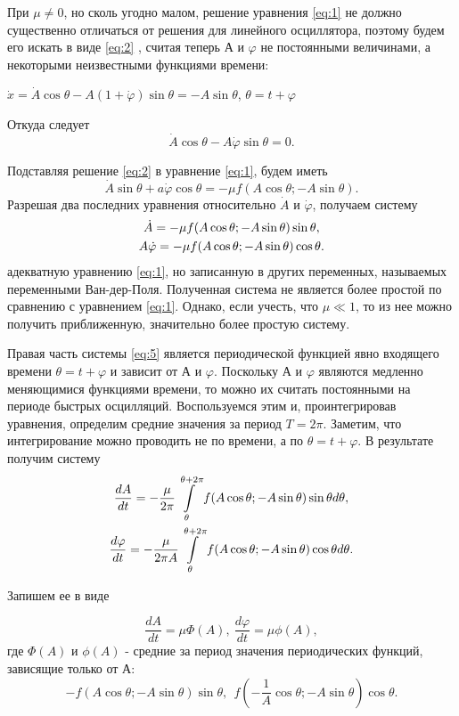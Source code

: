 При $\mu \ne 0$, но сколь угодно малом, решение уравнения \eqref{eq:1}  не должно существенно отличаться от решения для линейного осциллятора, поэтому будем его искать в виде \eqref{eq:2} , считая теперь А и $\varphi$ не постоянными величинами, а некоторыми неизвестными функциями времени:

\begin{center}
$\dot{x}=\dot{A} \cos\theta-A(1+\dot \varphi)\sin\theta=-A\sin\theta$, $\theta=t+\varphi$
\end{center}

Откуда следует $$\dot{A}\cos\theta-A\dot \varphi \sin\theta=0.$$

Подставляя решение  \eqref{eq:2} в уравнение  \eqref{eq:1}, будем иметь $$\dot{A}\sin\theta+a\dot \varphi \cos\theta=-\mu f(A\cos\theta;-A\sin\theta).$$
Разрешая два последних уравнения относительно $\dot{A}$ и $\dot{\varphi}$, получаем систему
\begin{gather}
\label{eq:5}
\dot{A}=-\mu f(A\cos\theta;-A\sin\theta)\sin\theta,\\\notag
A\dot{\varphi}=-\mu f(A\cos\theta;-A\sin\theta) \cos\theta.
\end{gather}
адекватную уравнению \eqref{eq:1}, но записанную в других переменных, называемых переменными Ван-дер-Поля. Полученная система не является более простой по сравнению с уравнением \eqref{eq:1}. Однако, если учесть, что $\mu \ll 1$, то из нее можно получить приближенную, значительно более простую систему.

Правая часть системы  \eqref{eq:5} является периодической функцией явно входящего времени $\theta=t+\varphi$ и зависит от А и $\varphi$. Поскольку  А и $\varphi$ являются медленно меняющимися функциями времени, то можно их считать постоянными на периоде быстрых осцилляций. Воспользуемся этим и, проинтегрировав уравнения, определим средние значения за период $T=2\pi$. Заметим, что интегрирование можно проводить не по времени, а по $\theta=t+\varphi$. В результате получим систему
\begin{gather}
\label{eq:6}
\frac{dA}{dt}=-\frac{\mu}{2\pi}\int\limits_\theta^{\theta+2\pi} f(A\cos\theta;-A\sin\theta)\sin\theta d\theta,\\\notag
\frac{d\varphi}{dt}=-\frac{\mu}{2\pi A}\int\limits_\theta^{\theta+2\pi} f(A\cos\theta;-A\sin\theta)\cos\theta d\theta.
\end{gather}

Запишем ее в виде
   
\begin{equation}
\label{eq:7}
\frac{dA}{dt}=\mu \Phi(A),~\frac{d\varphi}{dt}=\mu \phi(A),
\end{equation}
где $\Phi(A)$ и $\phi(A)$ - средние за период значения периодических функций, зависящие только от А: $$-f(A\cos\theta;-A\sin\theta)\sin\theta,~~f(-\frac{1}{A} \cos\theta;-A\sin\theta)\cos\theta.$$

